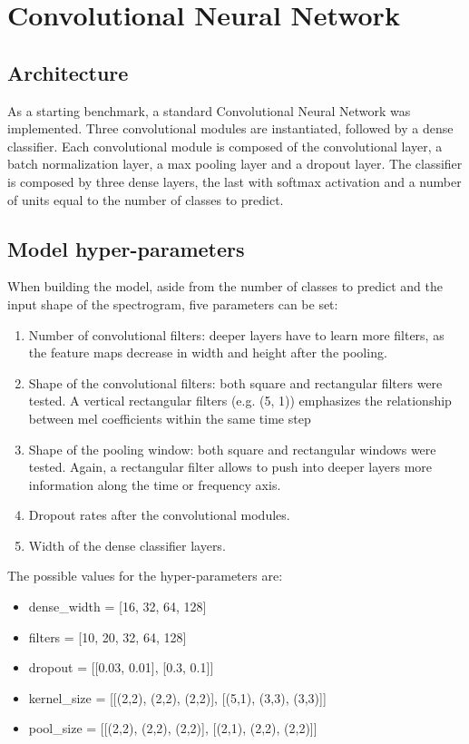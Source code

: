 \section{Convolutional Neural Network}
\label{sec:convolutional_arch}

\subsection{Architecture}

As a starting benchmark, a standard Convolutional Neural Network was implemented.
Three convolutional modules are instantiated, followed by a dense classifier.
Each convolutional module is composed of the convolutional layer, a batch
normalization layer, a max pooling layer and a dropout layer.
The classifier is composed by three dense layers, the last with softmax
activation and a number of units equal to the number of classes to predict.

\subsection{Model hyper-parameters}

When building the model, aside from the number of classes to predict and the
input shape of the spectrogram, five parameters can be set:
\begin{enumerate}
    \item Number of convolutional filters: deeper layers have to learn more
        filters, as the feature maps decrease in width and height after the
        pooling.
    \item Shape of the convolutional filters:
        both square and rectangular filters were tested.
        A vertical rectangular filters (e.g. (5, 1)) emphasizes the
        relationship between mel coefficients within the same time step
    \item Shape of the pooling window: 
        both square and rectangular windows were tested.
        Again, a rectangular filter allows to push into deeper layers more
        information along the time or frequency axis.
    \item Dropout rates after the convolutional modules.
    \item Width of the dense classifier layers.
\end{enumerate}
The possible values for the hyper-parameters are:
\begin{itemize}
    \item dense\_width = [16, 32, 64, 128]
    \item filters = [10, 20, 32, 64, 128]
    \item dropout = [[0.03, 0.01],  [0.3, 0.1]]
    \item kernel\_size = [[(2,2), (2,2), (2,2)], [(5,1), (3,3), (3,3)]]
    \item pool\_size = [[(2,2), (2,2), (2,2)], [(2,1), (2,2), (2,2)]]
\end{itemize}

